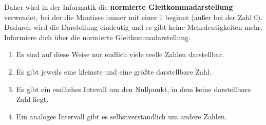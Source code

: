 \documentclass[
  11pt,
  a4paper,
  DIV=11,
  numbers=noendperiod]{scrartcl}
\providecommand{\tightlist}{%
  \setlength{\itemsep}{0pt}\setlength{\parskip}{0pt}}\usepackage{longtable,booktabs,array}
\begin{document}
Daher wird in der Informatik die \textbf{normierte
Gleitkommadarstellung} verwendet, bei der die Mantisse immer mit einer 1
beginnt (außer bei der Zahl 0). Dadurch wird die Darstellung eindeutig
und es gibt keine Mehrdeutigkeiten mehr. Informiere dich über die
normierte Gleitkommadarstellung.

\begin{tcolorbox}[enhanced jigsaw, bottomrule=.15mm, arc=.35mm, colframe=quarto-callout-important-color-frame, left=2mm, opacitybacktitle=0.6, colback=white, breakable, title=\textcolor{quarto-callout-important-color}{\faExclamation}\hspace{0.5em}{Folgerung}, titlerule=0mm, toprule=.15mm, rightrule=.15mm, leftrule=.75mm, colbacktitle=quarto-callout-important-color!10!white, coltitle=black, opacityback=0, toptitle=1mm, bottomtitle=1mm]

\begin{enumerate}
\def\labelenumi{\arabic{enumi}.}
\tightlist
\item
  Es sind auf diese Weise nur endlich viele reelle Zahlen darstellbar.
\item
  Es gibt jeweils eine kleinste und eine größte darstellbare Zahl.
\item
  Es gibt ein endliches Intevall um den Nullpunkt, in dem keine
  darstellbare Zahl liegt.
\item
  Ein analoges Intervall gibt es selbstverständlich um andere Zahlen.
\end{enumerate}

\end{tcolorbox}
\end{document}
